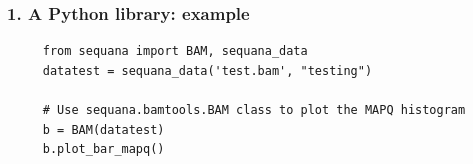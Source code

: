 \documentclass{beamer}
\begin{document}
\begin{frame}[fragile]
    \frametitle{1. A Python library: example}
    \begin{block}{}
    \begin{lstlisting}
     from sequana import BAM, sequana_data
     datatest = sequana_data('test.bam', "testing")

     # Use sequana.bamtools.BAM class to plot the MAPQ histogram
     b = BAM(datatest)
     b.plot_bar_mapq()
    \end{lstlisting}
    \end{block}
    
\end{frame}    
    
\end{document}
